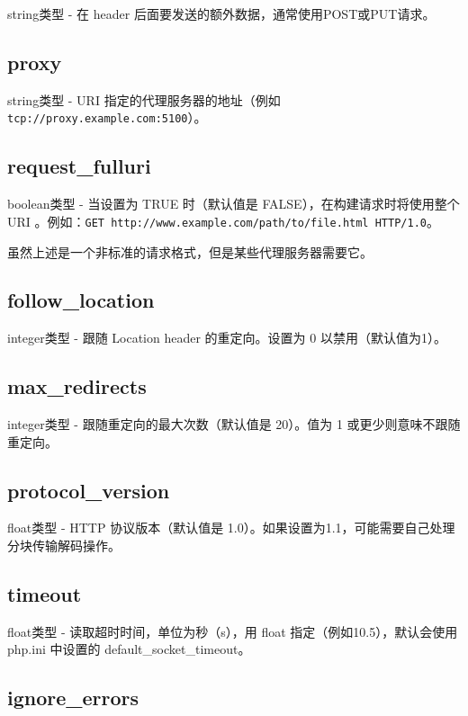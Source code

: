 string类型 - 在 header 后面要发送的额外数据，通常使用POST或PUT请求。



\subsection{proxy}

string类型 - URI 指定的代理服务器的地址（例如\texttt{tcp://proxy.example.com:5100}）。



\subsection{request\_fulluri}

boolean类型 - 当设置为 TRUE 时（默认值是 FALSE），在构建请求时将使用整个 URI 。例如：\texttt{GET http://www.example.com/path/to/file.html HTTP/1.0}。 

虽然上述是一个非标准的请求格式，但是某些代理服务器需要它。



\subsection{follow\_location}

integer类型 - 跟随 Location header 的重定向。设置为 0 以禁用（默认值为1）。

\subsection{max\_redirects}

integer类型 - 跟随重定向的最大次数（默认值是 20）。值为 1 或更少则意味不跟随重定向。

\subsection{protocol\_version}

float类型 - HTTP 协议版本（默认值是 1.0）。如果设置为1.1，可能需要自己处理分块传输解码操作。

\subsection{timeout}

float类型 - 读取超时时间，单位为秒（s），用 float 指定（例如10.5），默认会使用 php.ini 中设置的 default\_socket\_timeout。

\subsection{ignore\_errors}

